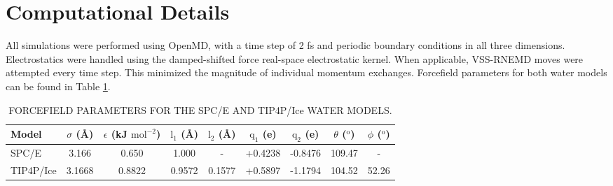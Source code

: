 
\section{Computational Details}
All simulations were performed using OpenMD,\cite{OOPSE,openmd} with a
time step of 2 fs and periodic boundary conditions in all three
dimensions.  Electrostatics were handled using the damped-shifted
force real-space electrostatic kernel.\cite{Ewald} When applicable,
VSS-RNEMD moves were attempted every time step. This minimized the
magnitude of individual momentum exchanges.  Forcefield parameters for
both water models can be found in Table \ref{tab:waterModels}.

\begin{table}
\centering
\caption{FORCEFIELD PARAMETERS FOR THE SPC/E AND TIP4P/Ice WATER MODELS.}
\label{tab:waterModels}
\begin{tabular}{|l|c|c|c|c|c|c|c|c|} 
\hline
  Model &  $\sigma$ (\AA) & $\epsilon$ (kJ $\mathrm{mol}^{-2}$) &
                                                              $\mathrm{l}_{1}$
                                                              (\AA) &
                                                                    $\mathrm{l}_{2}$
                                                                      (\AA)
  & $\mathrm{q}_{1}$ (e) & $\mathrm{q}_{2}$ (e) & $\theta$
                                                  ($^{\mathrm{o}}$) &
                                                                      $\phi$ ($^{\mathrm{o}}$) \\ \hline
  SPC/E & 3.166 & 0.650 & 1.000 & - & +0.4238 & -0.8476 & 109.47 & - \\
  TIP4P/Ice & 3.1668 & 0.8822 & 0.9572 & 0.1577 & +0.5897 & -1.1794 &
  104.52 & 52.26 \\
\hline
\end{tabular}
\end {table}


